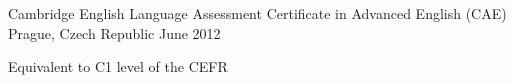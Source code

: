 \begin{cventries}
  \cventry
    {Cambridge English Language Assessment}
    {Certificate in Advanced English (CAE)}
    {Prague, Czech Republic}
    {June 2012}
    {
	  \begin{cvitems}
	    \item {Equivalent to C1 level of the CEFR}
	  \end{cvitems}
	}
\end{cventries}

